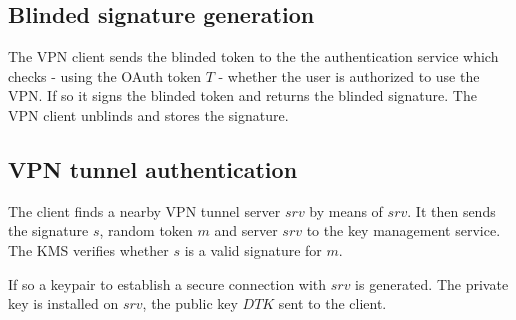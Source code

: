 \documentclass[a4paper]{scrreprt}
\newcommand{\var}[1]{\textit{#1}}
\begin{document}
\subsection{Blinded signature generation}

The VPN client sends the blinded token to the the authentication service which
checks - using the OAuth token $T$ - whether the user is authorized to use the
VPN.  If so it signs the blinded token and returns the blinded signature. The
VPN client unblinds and stores the signature.


\FloatBarrier

\subsection{VPN tunnel authentication}

The client finds a nearby VPN tunnel server $srv$ by means of $srv$. It then
sends the signature $s$, random token $m$ and server $srv$ to the key
management service. The KMS verifies whether $s$ is a valid signature for $m$.

If so a keypair to establish a secure connection with $srv$ is generated. The
private key is installed on $srv$, the public key $DTK$ sent to the client.
\end{document}
